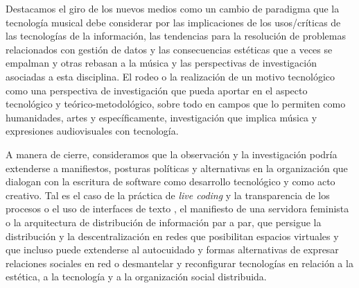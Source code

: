 Destacamos el giro de los nuevos medios como un cambio de paradigma que la tecnología musical debe considerar por las implicaciones de los usos/críticas de las tecnologías de la información, las tendencias para la resolución de problemas relacionados con gestión de datos y las consecuencias estéticas que a veces se empalman y otras rebasan a la música y las perspectivas de investigación asociadas a esta disciplina. El rodeo o la realización de un motivo tecnológico como una perspectiva de investigación que pueda aportar en el aspecto tecnológico y teórico-metodológico, sobre todo en campos que lo permiten como humanidades, artes y específicamente, investigación que implica música y expresiones audiovisuales con tecnología.


A manera de cierre, consideramos que la observación y la investigación podría extenderse a manifiestos, posturas políticas y alternativas en la organización que dialogan con la escritura de software como desarrollo tecnológico y como acto creativo. Tal es el caso de la práctica de \textit{live coding} y la transparencia de los procesos o el uso de interfaces de texto \citep{collinsLivecoding}, el manifiesto de una servidora feminista \citep{feministserver} o la arquitectura de distribución de información par a par, que persigue la distribución y la descentralización en redes que posibilitan espacios virtuales \citep{cyberspace} y que incluso puede extenderse al autocuidado y formas alternativas de expresar relaciones sociales en red \citep{dwc} o desmantelar y reconfigurar tecnologías en relación a la estética, a la tecnología y a la organización social distribuida. 








